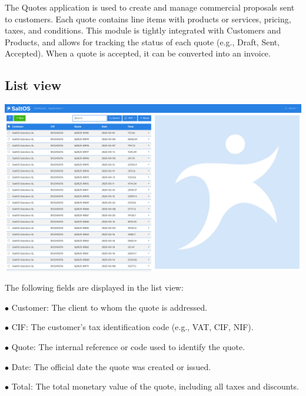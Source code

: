 \documentclass[a4paper]{article}
\begin{document}
The Quotes application is used to create and manage commercial proposals sent to customers.
Each quote contains line items with products or services, pricing, taxes, and conditions.
This module is tightly integrated with Customers and Products, and allows for tracking the status of each quote
(e.g., Draft, Sent, Accepted). When a quote is accepted, it can be converted into an invoice.

\hypertarget{toc73}{}
\subsection{List view}

\begin{center}\includegraphics[width=1\textwidth]{../ujest/snaps/test-screenshots-js-screenshots-crm-quotes-list-en-us-1-snap.png}\end{center}

The following fields are displayed in the list view:

\begin{compactitem}
\item[\color{myblue}$\bullet$] Customer: The client to whom the quote is addressed.
\item[\color{myblue}$\bullet$] CIF: The customer's tax identification code (e.g., VAT, CIF, NIF).
\item[\color{myblue}$\bullet$] Quote: The internal reference or code used to identify the quote.
\item[\color{myblue}$\bullet$] Date: The official date the quote was created or issued.
\item[\color{myblue}$\bullet$] Total: The total monetary value of the quote, including all taxes and discounts.
\end{compactitem}

\hypertarget{toc74}{}
\end{document}
